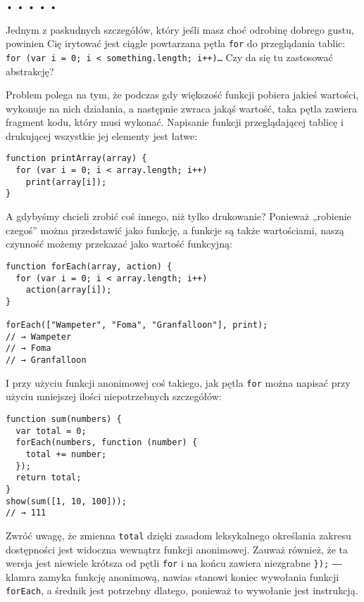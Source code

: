 \begin{center}
• • • • •
\end{center}

  
Jednym z paskudnych szczegółów, który jeśli masz choć odrobinę dobrego gustu, powinien Cię irytować jest ciągle powtarzana pętla \texttt{for} do przeglądania tablic: \texttt{for (var i = 0; i < something.length; i++)…} Czy da się tu zastosować abstrakcję?

  
Problem polega na tym, że podczas gdy większość funkcji pobiera jakieś wartości, wykonuje na nich działania, a następnie zwraca jakąś wartość, taka pętla zawiera fragment kodu, który musi wykonać. Napisanie funkcji przeglądającej tablicę i drukującej wszystkie jej elementy jest łatwe:

  
\begin{verbatim} 
function printArray(array) {
  for (var i = 0; i < array.length; i++)
    print(array[i]);
}
 \end{verbatim}
  
A gdybyśmy chcieli zrobić coś innego, niż tylko drukowanie? Ponieważ „robienie czegoś” można przedstawić jako funkcję, a funkcje są także wartościami, naszą czynność możemy przekazać jako wartość funkcyjną:

  
\begin{verbatim} 
function forEach(array, action) {
  for (var i = 0; i < array.length; i++)
    action(array[i]);
}

forEach(["Wampeter", "Foma", "Granfalloon"], print);
// → Wampeter
// → Foma
// → Granfalloon
\end{verbatim}
  
I przy użyciu funkcji anonimowej coś takiego, jak pętla \texttt{for} można napisać przy użyciu mniejszej ilości niepotrzebnych szczegółów:

  
\begin{verbatim} 
function sum(numbers) {
  var total = 0;
  forEach(numbers, function (number) {
    total += number;
  });
  return total;
}
show(sum([1, 10, 100]));
// → 111
\end{verbatim}
  
Zwróć uwagę, że zmienna \texttt{total} dzięki zasadom leksykalnego określania zakresu dostępności jest widoczna wewnątrz funkcji anonimowej. Zauważ również, że ta wersja jest niewiele krótsza od pętli \texttt{for} i na końcu zawiera niezgrabne \texttt{\});} ― klamra zamyka funkcję anonimową, nawias stanowi koniec wywołania funkcji \texttt{forEach}, a średnik jest potrzebny dlatego, ponieważ to wywołanie jest instrukcją.

